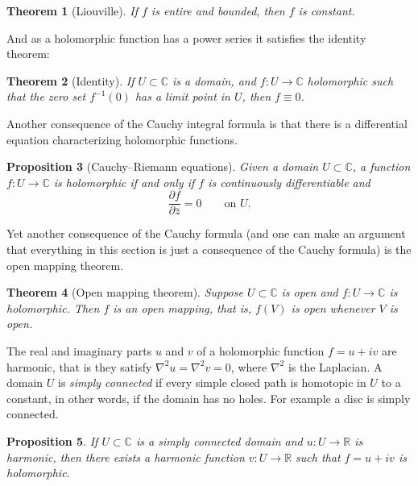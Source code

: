 \documentclass[12pt,openany]{book}
\newcommand{\C}{{\mathbb{C}}}
\newcommand{\R}{{\mathbb{R}}}
\newcommand{\myindex}[1]{#1\index{#1}}
\theoremstyle{plain}
\newtheorem{thm}{Theorem}[section]
\newtheorem{prop}[thm]{Proposition}
\theoremstyle{remark}
\theoremstyle{definition}
\theoremstyle{exercise}
\theoremstyle{example}
\begin{document}
\begin{thm}[Liouville]
If $f$ is entire and bounded, then $f$ is constant.
\end{thm}

And as a holomorphic function has a power series it satisfies the
identity theorem:

\begin{thm}[Identity]
If $U \subset \C$ is a domain, and $f \colon U \to \C$ holomorphic
such that the zero set $f^{-1}(0)$ has a limit point in $U$, then
$f \equiv 0$.
\end{thm}

Another consequence  of the Cauchy integral formula is that there is
a differential equation characterizing holomorphic functions.

\begin{prop}[Cauchy--Riemann equations]
Given a domain $U \subset \C$,
a function $f \colon U \to \C$ is holomorphic if and only if
$f$ is continuously differentiable and
\begin{equation*}
\frac{\partial f}{\partial \bar{z}} = 0 \qquad \text{on $U$.}
\end{equation*}
\end{prop}

Yet another consequence of the Cauchy formula (and one can make an argument
that everything in this section is just a consequence of the Cauchy formula)
is the open mapping theorem.

\begin{thm}[Open mapping theorem]
Suppose $U \subset \C$ is open and
$f \colon U \to \C$ is holomorphic.  Then $f$ is an open mapping, that is,
$f(V)$ is open whenever $V$ is open.
\end{thm}

The real and imaginary parts $u$ and $v$ of a holomorphic function $f =
u+iv$ are harmonic, that is
they satisfy $\nabla^2 u = \nabla^2 v = 0$, where $\nabla^2$ is the
Laplacian.
A domain $U$ is \emph{\myindex{simply connected}} if every simple closed
path
is homotopic in $U$ to a constant, in other words, if the domain has no
holes.  For example a disc is simply connected.

\begin{prop}
If $U \subset \C$ is a simply connected domain and $u \colon U \to \R$
is harmonic, then there exists a harmonic function $v \colon U \to \R$
such that $f = u+iv$ is holomorphic.
\end{prop}
\end{document}
